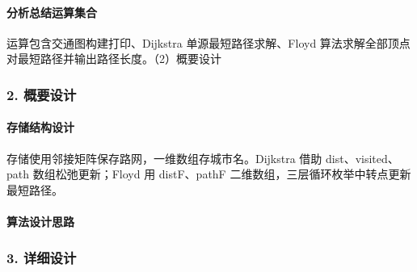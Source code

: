 \documentclass{ctexart}
\begin{document}
\paragraph{分析总结运算集合}
运算包含交通图构建打印、Dijkstra 单源最短路径求解、Floyd 算法求解全部顶点对最短路径并输出路径长度。（2）概要设计
\subsubsection{2. 概要设计}
\paragraph{存储结构设计}
存储使用邻接矩阵保存路网，一维数组存城市名。Dijkstra 借助 dist、visited、path 数组松弛更新；Floyd 用 distF、pathF 二维数组，三层循环枚举中转点更新最短路径。
\paragraph{算法设计思路}
\subsubsection{3. 详细设计}
\end{document}
